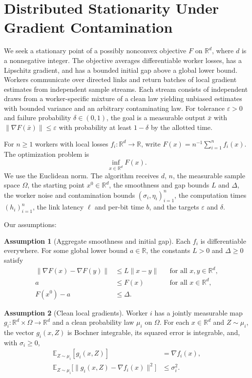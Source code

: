 \documentclass[10pt]{article}
\theoremstyle{definition}
\newtheorem{assumption}{Assumption}
\begin{document}
\section*{Distributed Stationarity Under Gradient Contamination}
We seek a stationary point of a possibly nonconvex objective $F$ on $\mathbb{R}^d$, where $d$ is a nonnegative integer. The objective averages differentiable worker losses, has a Lipschitz gradient, and has a bounded initial gap above a global lower bound. Workers communicate over directed links and return batches of local gradient estimates from independent sample streams. Each stream consists of independent draws from a worker-specific mixture of a clean law yielding unbiased estimates with bounded variance and an arbitrary contaminating law. For tolerance $\varepsilon>0$ and failure probability $\delta\in(0,1)$, the goal is a measurable output $\bar{x}$ with $\|\nabla F(\bar{x})\|\leq\varepsilon$ with probability at least $1-\delta$ by the allotted time.

For $n\geq 1$ workers with local losses $f_i:\mathbb{R}^d\to\mathbb{R}$, write $F(x)=n^{-1}\sum_{i=1}^n f_i(x)$. The optimization problem is
\[
\inf_{x\in\mathbb{R}^d} F(x).
\]
We use the Euclidean norm. The algorithm receives $d$, $n$, the measurable sample space $\Omega$, the starting point $x^0\in\mathbb{R}^d$, the smoothness and gap bounds $L$ and $\Delta$, the worker noise and contamination bounds $(\sigma_i,\eta_i)_{i=1}^n$, the computation times $(h_i)_{i=1}^n$, the link latency $\ell$ and per-bit time $b$, and the targets $\varepsilon$ and $\delta$.

Our assumptions:
\begin{assumption}[Aggregate smoothness and initial gap]
Each $f_i$ is differentiable everywhere. For some global lower bound $a\in\mathbb{R}$, the constants $L>0$ and $\Delta\geq 0$ satisfy
\[
\begin{aligned}
\|\nabla F(x)-\nabla F(y)\| &\leq L\|x-y\| &&\text{for all }x,y\in\mathbb{R}^d,\\
a &\leq F(x) &&\text{for all }x\in\mathbb{R}^d,\\
F(x^0)-a &\leq \Delta.
\end{aligned}
\]
\end{assumption}

\begin{assumption}[Clean local gradients]
Worker $i$ has a jointly measurable map $g_i:\mathbb{R}^d\times\Omega\to\mathbb{R}^d$ and a clean probability law $\mu_i$ on $\Omega$. For each $x\in\mathbb{R}^d$ and $Z\sim\mu_i$, the vector $g_i(x,Z)$ is Bochner integrable, its squared error is integrable, and, with $\sigma_i\geq 0$,
\[
\begin{aligned}
\mathbb{E}_{Z\sim\mu_i}[g_i(x,Z)] &= \nabla f_i(x),\\
\mathbb{E}_{Z\sim\mu_i}\bigl[\|g_i(x,Z)-\nabla f_i(x)\|^2\bigr] &\leq \sigma_i^2.
\end{aligned}
\]
\end{assumption}
\end{document}
